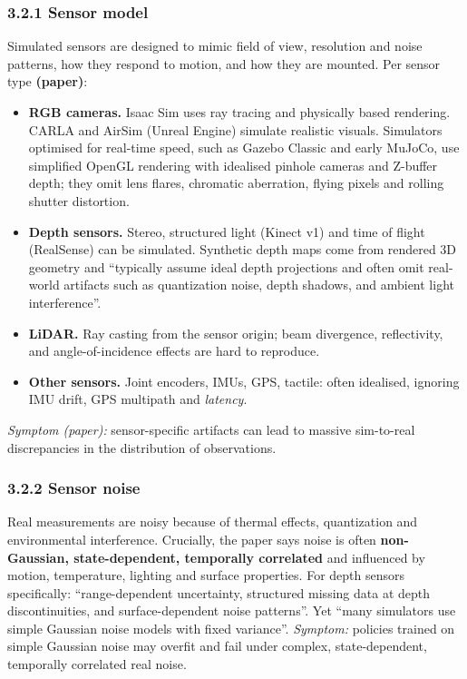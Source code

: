\documentclass[11pt,a4paper]{article}
\begin{document}
\subsubsection*{3.2.1 Sensor model}
Simulated sensors are designed to mimic field of view, resolution and noise patterns, how they
respond to motion, and how they are mounted. Per sensor type \textbf{(paper)}:
\begin{itemize}
\item \textbf{RGB cameras.} Isaac Sim uses ray tracing and physically based rendering. CARLA and
AirSim (Unreal Engine) simulate realistic visuals. Simulators optimised for real-time speed, such
as Gazebo Classic and early MuJoCo, use simplified OpenGL rendering with idealised pinhole
cameras and Z-buffer depth; they omit lens flares, chromatic aberration, flying pixels and rolling
shutter distortion.
\item \textbf{Depth sensors.} Stereo, structured light (Kinect v1) and time of flight (RealSense)
can be simulated. Synthetic depth maps come from rendered 3D geometry and ``typically assume
ideal depth projections and often omit real-world artifacts such as quantization noise, depth
shadows, and ambient light interference''.
\item \textbf{LiDAR.} Ray casting from the sensor origin; beam divergence, reflectivity, and
angle-of-incidence effects are hard to reproduce.
\item \textbf{Other sensors.} Joint encoders, IMUs, GPS, tactile: often idealised, ignoring IMU
drift, GPS multipath and \emph{latency}.
\end{itemize}
\emph{Symptom (paper):} sensor-specific artifacts can lead to massive sim-to-real discrepancies
in the distribution of observations.

\subsubsection*{3.2.2 Sensor noise}
Real measurements are noisy because of thermal effects, quantization and environmental
interference. Crucially, the paper says noise is often \textbf{non-Gaussian, state-dependent,
temporally correlated} and influenced by motion, temperature, lighting and surface properties.
For depth sensors specifically: ``range-dependent uncertainty, structured missing data at depth
discontinuities, and surface-dependent noise patterns''. Yet ``many simulators use simple Gaussian
noise models with fixed variance''. \emph{Symptom:} policies trained on simple Gaussian noise may
overfit and fail under complex, state-dependent, temporally correlated real noise.
\end{document}
